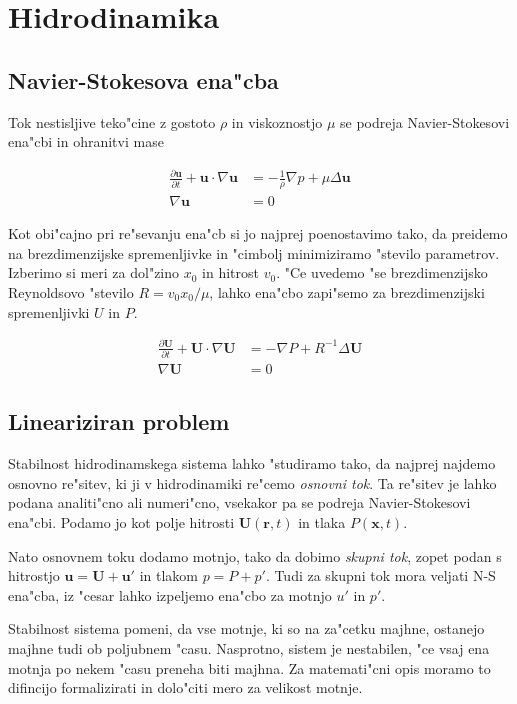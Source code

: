 \documentclass[a4paper,10pt]{article}
\renewcommand{\vec}{\mathbf}
\begin{document}
\section{Hidrodinamika}

\subsection{Navier-Stokesova ena"cba}

Tok nestisljive teko"cine z gostoto $\rho$ in viskoznostjo $\mu$ se podreja Navier-Stokesovi ena"cbi in ohranitvi mase

\begin{align}
 \label{eq:ns-enacba}
\frac{\partial \vec u}{\partial t} + \vec u \cdot \nabla \vec u &= -\frac{1}{\rho}\nabla p + \mu \Delta \vec u \\
\nabla \vec u &= 0
\end{align}

Kot obi"cajno pri re"sevanju ena"cb si jo najprej poenostavimo tako, da preidemo na brezdimenzijske spremenljivke in "cimbolj minimiziramo "stevilo parametrov. Izberimo si meri za dol"zino $x_0$ in hitrost $v_0$. "Ce uvedemo "se brezdimenzijsko Reynoldsovo "stevilo $R=v_0 x_0 / \mu$, lahko ena"cbo zapi"semo za brezdimenzijski spremenljivki $U$ in $P$. 

\begin{align}
 \label{eq:ns-brezdim}
\frac{\partial \vec U}{\partial t} + \vec U \cdot \nabla \vec U &= -\nabla P + R^{-1} \Delta \vec U \\
\nabla \vec U &= 0
\end{align}

\subsection{Lineariziran problem}

Stabilnost hidrodinamskega sistema lahko "studiramo tako, da najprej najdemo osnovno re"sitev, ki ji v hidrodinamiki re"cemo \emph{osnovni tok}. Ta re"sitev je lahko podana analiti"cno ali numeri"cno, vsekakor pa se podreja Navier-Stokesovi ena"cbi. Podamo jo kot polje hitrosti $\vec U(\vec r, t)$ in tlaka $P(\vec x, t)$. 

Nato osnovnem toku dodamo motnjo, tako da dobimo \emph{skupni tok}, zopet podan s hitrostjo $\vec u = \vec U + \vec u'$ in tlakom $p = P + p'$. Tudi za skupni tok mora veljati N-S ena"cba, iz "cesar lahko izpeljemo ena"cbo za motnjo $u'$ in $p'$. 

Stabilnost sistema pomeni, da vse motnje, ki so na za"cetku majhne, ostanejo majhne tudi ob poljubnem "casu. Nasprotno, sistem je nestabilen, "ce vsaj ena motnja po nekem "casu preneha biti majhna. Za matemati"cni opis moramo to difincijo formalizirati in dolo"citi mero za velikost motnje. 
\end{document}
